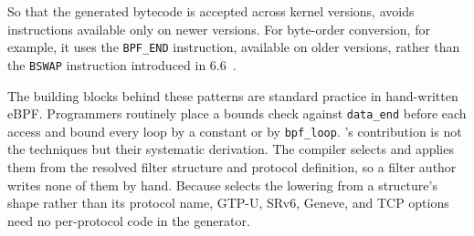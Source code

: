 So that the generated bytecode is accepted across kernel versions,
\kunai avoids instructions available only on newer versions. For
byte-order conversion, for example, it uses the \texttt{BPF\_END}
instruction, available on older versions, rather than the
\texttt{BSWAP} instruction introduced in 6.6~\cite{bpf_isa,bpf_cpuv4}.

The building blocks behind these patterns are standard practice in
hand-written eBPF. Programmers routinely place a bounds check against
\texttt{data\_end} before each access and bound every loop by a
constant or by \texttt{bpf\_loop}. \kunai's contribution is not the
techniques but their systematic derivation. The compiler selects and
applies them from the resolved filter structure and protocol
definition, so a filter author writes none of them by hand. Because
\kunai selects the lowering from a structure's shape rather than its
protocol name, GTP-U, SRv6, Geneve, and TCP options need no
per-protocol code in the generator.
